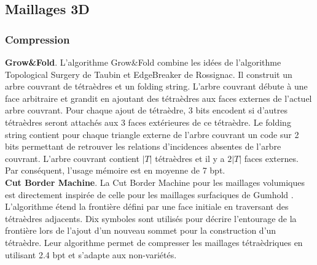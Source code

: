 \normalsize
\subsection{Maillages 3D}
\subsubsection{Compression}
\noindent
\textbf{Grow\&Fold}. L'algorithme Grow\&Fold \cite{grow_and_fold} combine les idées de l'algorithme Topological Surgery \cite{topological_surgery} de Taubin et EdgeBreaker \cite{edgebreaker} de Rossignac. Il construit un arbre couvrant de tétraèdres et un folding string. L'arbre couvrant débute à une face arbitraire et grandit en ajoutant des tétraèdres aux faces externes de l'actuel arbre couvrant. Pour chaque ajout de tétraèdre, 3 bits encodent si d'autres tétraèdres seront attachés aux 3 faces extérieures de ce tétraèdre. Le folding string contient pour chaque triangle externe de l'arbre couvrant un code sur 2 bits permettant de retrouver les relations d'incidences absentes de l'arbre couvrant. L'arbre couvrant contient $|T|$ tétraèdres et il y a $2|T|$ faces externes. Par conséquent, l'usage mémoire est en moyenne de 7 bpt.\\
\textbf{Cut Border Machine}. La Cut Border Machine pour les maillages volumiques \cite{cut_border_machine_2d} est directement inspirée de celle pour les maillages surfaciques de Gumhold \cite{cut_border_machine_3d}. L'algorithme étend la frontière défini par une face initiale en traversant des tétraèdres adjacents. Dix symboles sont utilisés pour décrire l'entourage de la frontière lors de l'ajout d'un nouveau sommet pour la construction d'un tétraèdre. Leur algorithme permet de compresser les maillages tétraèdriques en utilisant 2.4 bpt et s'adapte aux non-variétés.
 
